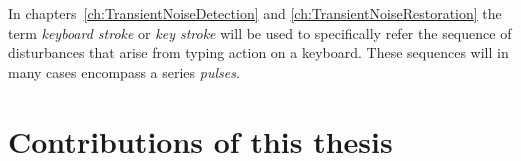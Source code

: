 In chapters~\ref{ch:TransientNoiseDetection} and \ref{ch:TransientNoiseRestoration} the term \emph{keyboard stroke} or \emph{key stroke} will be used to specifically refer the sequence of disturbances that arise from typing action on a keyboard. These sequences will in many cases encompass a series \emph{pulses}.


\section{Contributions of this thesis}


